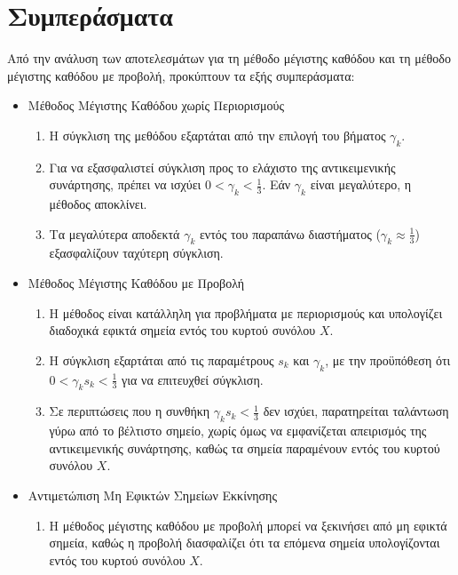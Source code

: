 \documentclass[a4paper,12pt]{article}
\begin{document}
\newpage

\section*{Συμπεράσματα}

Από την ανάλυση των αποτελεσμάτων για τη μέθοδο μέγιστης καθόδου και τη μέθοδο μέγιστης καθόδου με προβολή, 
προκύπτουν τα εξής συμπεράσματα:

\begin{itemize}
    \item Μέθοδος Μέγιστης Καθόδου χωρίς Περιορισμούς
        \begin{enumerate}
            \item Η σύγκλιση της μεθόδου εξαρτάται από την επιλογή του βήματος $\gamma_k$.
            \item Για να εξασφαλιστεί σύγκλιση προς το ελάχιστο της αντικειμενικής συνάρτησης, πρέπει να ισχύει 
            $0 < \gamma_k < \frac{1}{3}$. Εάν $\gamma_k$ είναι μεγαλύτερο, η μέθοδος αποκλίνει.
            \item Τα μεγαλύτερα αποδεκτά $\gamma_k$ εντός του παραπάνω διαστήματος ($\gamma_k \approx \frac{1}{3}$) 
            εξασφαλίζουν ταχύτερη σύγκλιση.
        \end{enumerate}
    \item Μέθοδος Μέγιστης Καθόδου με Προβολή
    \begin{enumerate}
        \item Η μέθοδος είναι κατάλληλη για προβλήματα με περιορισμούς και υπολογίζει διαδοχικά εφικτά σημεία εντός του 
        κυρτού συνόλου $X$.
        \item Η σύγκλιση εξαρτάται από τις παραμέτρους $s_k$ και $\gamma_k$, με την προϋπόθεση ότι 
        $0 < \gamma_k s_k < \frac{1}{3}$ για να επιτευχθεί σύγκλιση.
        \item Σε περιπτώσεις που η συνθήκη $\gamma_k s_k < \frac{1}{3}$ δεν ισχύει, παρατηρείται ταλάντωση γύρω από το
        βέλτιστο σημείο, χωρίς όμως να εμφανίζεται απειρισμός της αντικειμενικής συνάρτησης, καθώς τα σημεία παραμένουν
        εντός του κυρτού συνόλου $X$.
    \end{enumerate}
    \item Αντιμετώπιση Μη Εφικτών Σημείων Εκκίνησης
    \begin{enumerate}
        \item Η μέθοδος μέγιστης καθόδου με προβολή μπορεί να ξεκινήσει από μη εφικτά σημεία, καθώς η προβολή διασφαλίζει
        ότι τα επόμενα σημεία υπολογίζονται εντός του κυρτού συνόλου $X$.

\end{enumerate}
\end{itemize}
\end{document}
